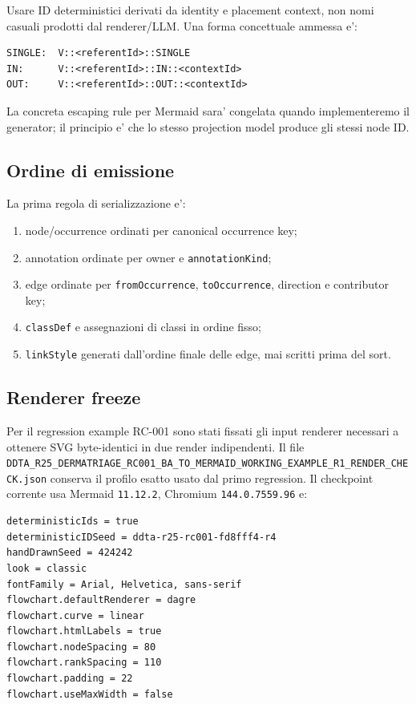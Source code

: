 \documentclass[11pt,a4paper]{article}
\begin{document}
Usare ID deterministici derivati da identity e placement context, non nomi casuali prodotti dal renderer/LLM. Una forma concettuale ammessa e':

\begin{lstlisting}
SINGLE:  V::<referentId>::SINGLE
IN:      V::<referentId>::IN::<contextId>
OUT:     V::<referentId>::OUT::<contextId>
\end{lstlisting}

La concreta escaping rule per Mermaid sara' congelata quando implementeremo il generator; il principio e' che lo stesso projection model produce gli stessi node ID.

\subsection{Ordine di emissione}

La prima regola di serializzazione e':

\begin{enumerate}
  \item node/occurrence ordinati per canonical occurrence key;
  \item annotation ordinate per owner e \texttt{annotationKind};
  \item edge ordinate per \texttt{fromOccurrence}, \texttt{toOccurrence}, direction e contributor key;
  \item \texttt{classDef} e assegnazioni di classi in ordine fisso;
  \item \texttt{linkStyle} generati dall'ordine finale delle edge, mai scritti prima del sort.
\end{enumerate}

\subsection{Renderer freeze}

Per il regression example RC-001 sono stati fissati gli input renderer necessari a ottenere SVG byte-identici in due render indipendenti. Il file \nolinkurl{DDTA_R25_DERMATRIAGE_RC001_BA_TO_MERMAID_WORKING_EXAMPLE_R1_RENDER_CHECK.json} conserva il profilo esatto usato dal primo regression. Il checkpoint corrente usa Mermaid \texttt{11.12.2}, Chromium \texttt{144.0.7559.96} e:

\begin{lstlisting}
deterministicIds = true
deterministicIDSeed = ddta-r25-rc001-fd8fff4-r4
handDrawnSeed = 424242
look = classic
fontFamily = Arial, Helvetica, sans-serif
flowchart.defaultRenderer = dagre
flowchart.curve = linear
flowchart.htmlLabels = true
flowchart.nodeSpacing = 80
flowchart.rankSpacing = 110
flowchart.padding = 22
flowchart.useMaxWidth = false
\end{lstlisting}
\end{document}
